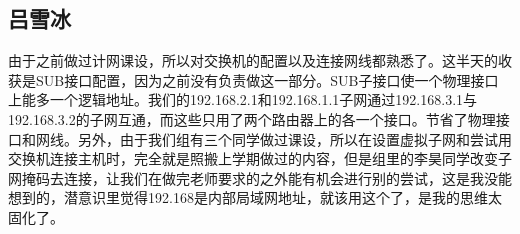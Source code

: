 \subsection{吕雪冰}
由于之前做过计网课设，所以对交换机的配置以及连接网线都熟悉了。这半天的收获是SUB接口配置，因为之前没有负责做这一部分。SUB子接口使一个物理接口上能多一个逻辑地址。我们的192.168.2.1和192.168.1.1子网通过192.168.3.1与192.168.3.2的子网互通，而这些只用了两个路由器上的各一个接口。节省了物理接口和网线。另外，由于我们组有三个同学做过课设，所以在设置虚拟子网和尝试用交换机连接主机时，完全就是照搬上学期做过的内容，但是组里的李昊同学改变子网掩码去连接，让我们在做完老师要求的之外能有机会进行别的尝试，这是我没能想到的，潜意识里觉得192.168是内部局域网地址，就该用这个了，是我的思维太固化了。
